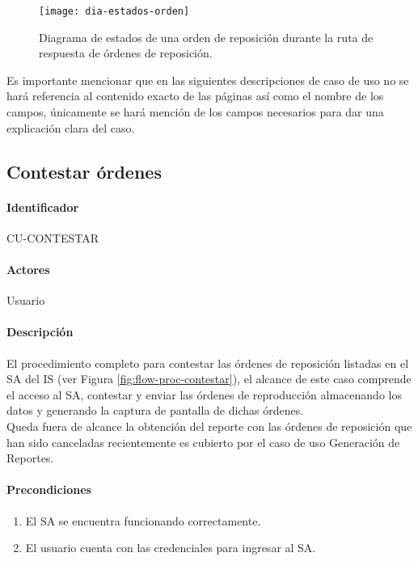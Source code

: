 \begin{figure}[h]
  \centering
  \texttt{[image: dia-estados-orden]} 
  \caption{Diagrama de estados de una orden de reposición durante la ruta de respuesta de órdenes de reposición.}
  \label{fig:dia-estados-orden}
\end{figure}

Es importante mencionar que en las siguientes descripciones de caso de uso no se hará referencia al contenido exacto de las páginas así como el nombre de los campos, únicamente se hará mención de los campos necesarios para dar una explicación clara del caso.

\subsection{Contestar órdenes}
\paragraph*{Identificador}
CU-CONTESTAR
\paragraph*{Actores}
Usuario
\paragraph*{Descripción}
El procedimiento completo para contestar las órdenes de reposición listadas en el SA del IS (ver Figura \ref{fig:flow-proc-contestar}), el alcance de este caso comprende el acceso al SA, contestar y enviar las órdenes de reproducción almacenando los datos y generando la captura de pantalla de dichas órdenes.\\
Queda fuera de alcance la obtención del reporte con las órdenes de reposición que han sido canceladas recientemente es cubierto por el caso de uso Generación de Reportes.
\paragraph*{Precondiciones}
\begin{enumerate}
  \item El SA se encuentra funcionando correctamente.
  \item El usuario cuenta con las credenciales para ingresar al SA.
\end{enumerate}

